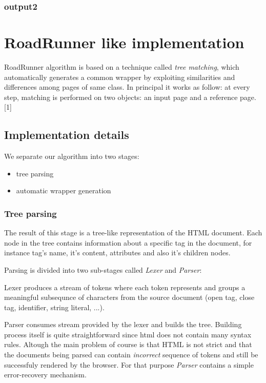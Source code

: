 \documentclass[runningheads]{llncs}
\begin{document}
\subsubsection{output2}

\section{RoadRunner like implementation}

RoadRunner algorithm is based on a technique called \textit{tree matching}, which automatically generates a common wrapper by exploiting similarities and differences among pages of same class. In principal it works as follow:
at every step, matching is performed on two objects: an input page and a reference page. [1]

\subsection{Implementation details}

We separate our algorithm into two stages:
\begin{itemize}
	\item tree parsing
	\item automatic wrapper generation
\end{itemize}

\subsubsection{Tree parsing}

The result of this stage is a tree-like representation of the HTML document. Each node in the tree contains information about a specific tag in the document, for instance tag's name, it's content, attributes and also it's children nodes. 

Parsing is divided into two sub-stages called \textit{Lexer} and \textit{Parser}:

Lexer produces a stream of tokens where each token represents and groups a meaningful subsequnce of characters from the source document (open tag, close tag, identifier, string literal, ...). 

Parser consumes stream provided by the lexer and builds the tree. Building process itself is quite straightforward since html does not contain many syntax rules. Altough the main problem of course is that HTML is not strict and that the documents being parsed can contain \textit{incorrect} sequence of tokens and still be successfuly rendered by the browser. For that purpose \textit{Parser} contains a simple error-recovery mechanism.
\end{document}
